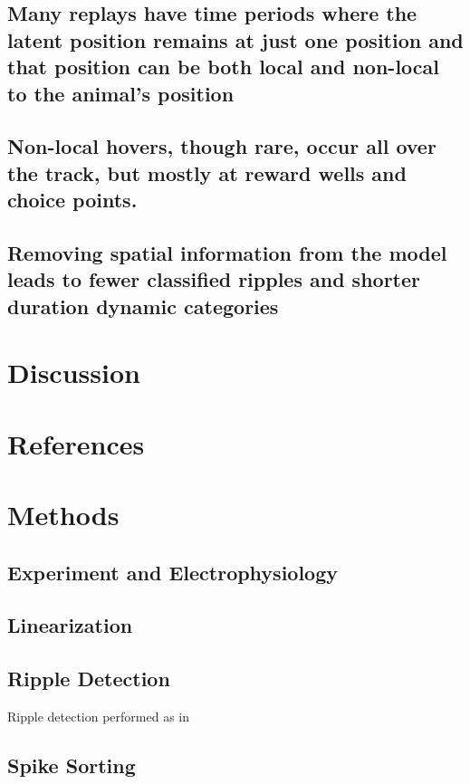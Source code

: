 \documentclass[times, twoside]{zHenriquesLab-StyleBioRxiv}
\begin{document}
\subsection*{Many replays have time periods where the latent position remains at just one position and that position can be both local and non-local to the animal's position}
\subsection*{Non-local hovers, though rare, occur all over the track, but mostly at reward wells and choice points.}

\subsection*{Removing spatial information from the model leads to fewer classified ripples and shorter duration dynamic categories}

\section*{Discussion}


\begin{acknowledgements}
\end{acknowledgements}

\section*{References}


\onecolumn
\newpage

\section*{Methods}
\subsection*{Experiment and Electrophysiology}
\subsection*{Linearization}
\subsection*{Ripple Detection}
Ripple detection performed as in
\subsection*{Spike Sorting}
\end{document}
